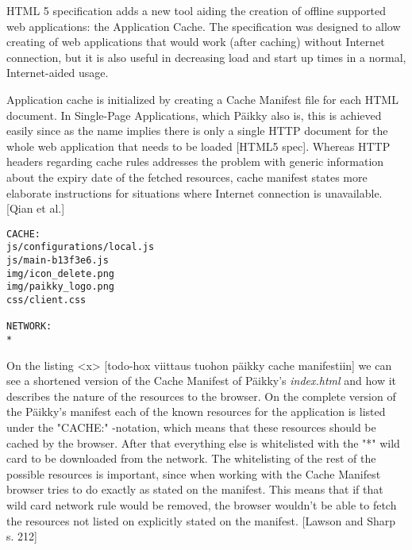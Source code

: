 
HTML 5 specification adds a new tool aiding the creation of offline supported web applications: the Application Cache. The specification was designed to allow creating of web applications that would work (after caching) without Internet connection, but it is also useful in decreasing load and start up times in a normal, Internet-aided usage. 

Application cache is initialized by creating a Cache Manifest file for each HTML document. In Single-Page Applications, which Päikky also is, this is achieved easily since as the name implies there is only a single HTTP document for the whole web application that needs to be loaded [HTML5 spec].  Whereas HTTP headers regarding cache rules addresses the problem with generic information about the expiry date of the fetched resources, cache manifest states more elaborate instructions for situations where Internet connection is unavailable. [Qian et al.]

\begin{lstlisting}
CACHE:
js/configurations/local.js
js/main-b13f3e6.js
img/icon_delete.png
img/paikky_logo.png
css/client.css

NETWORK:
*
\end{lstlisting} %

On the listing <x> [todo-hox viittaus tuohon päikky cache manifestiin] we can see a shortened version of the Cache Manifest of Päikky's \textit{index.html} and how it describes the nature of the resources to the browser. On the complete version of the Päikky's manifest each of the known resources for the application is listed under the "CACHE:" -notation, which means that these resources should be cached by the browser. After that everything else is whitelisted with the "*" wild card to be downloaded from the network. The whitelisting of the rest of the possible resources is important, since when working with the Cache Manifest browser tries to do exactly as stated on the manifest. This means that if that wild card network rule would be removed, the browser wouldn't be able to fetch the resources not listed on explicitly stated on the manifest. [Lawson and Sharp s. 212] %

